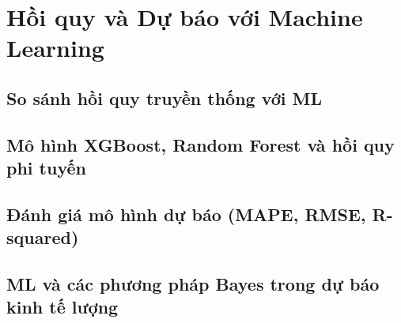 \chapter{Hồi quy và Dự báo với Machine Learning}
\section{So sánh hồi quy truyền thống với ML}
\section{Mô hình XGBoost, Random Forest và hồi quy phi tuyến}
\section{Đánh giá mô hình dự báo (MAPE, RMSE, R-squared)}
\section{ML và các phương pháp Bayes trong dự báo kinh tế lượng}